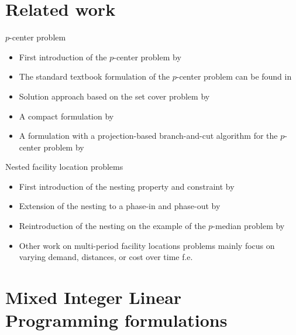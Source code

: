\documentclass[utf8,aspectratio=169,ngerman,english]{beamer}
\begin{document}
\section{Related work}
\begin{frame}{$p$-center problem}
    \begin{itemize}
        \item First introduction of the $p$-center problem by \textcite{Hakimi1964}
        \item The standard textbook formulation of the $p$-center problem can be found in \textcite{wiley2013}
        \item Solution approach based on the set cover problem by \textcite{Contardo2018}
        \item A compact formulation by \textcite{Elloumi2004,Elloumi2018}
        \item A formulation with a projection-based branch-and-cut algorithm for the $p$-center problem by \textcite{GAAR2022}
    \end{itemize}
\end{frame}

\begin{frame}{Nested facility location problems}
    \begin{itemize}
        \item First introduction of the nesting property and constraint by \textcite{Roodman1975}
        \item Extension of the nesting to a phase-in and phase-out by \textcite{Roodman1977}
        \item Reintroduction of the nesting on the example of the $p$-median problem by \textcite{McGarvey2022}
        \item Other work on multi-period facility locations problems mainly focus on varying demand, distances, or cost over time f.e. \textcite{CALOGIURI2021}
    \end{itemize}
\end{frame}

\section{Mixed Integer Linear Programming formulations}
\end{document}
